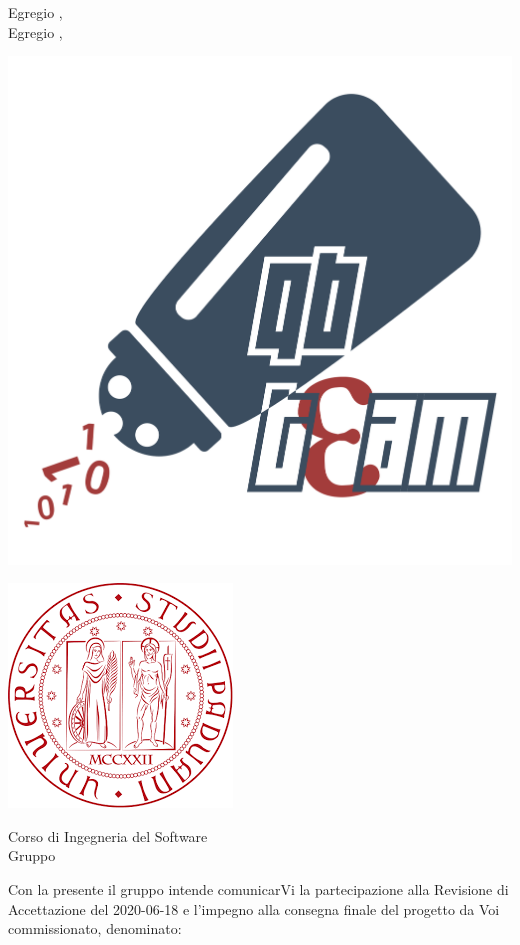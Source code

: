 \documentclass[12pt]{letter}
\begin{document}
    \begin{letter}
        { Egregio \VT{},\\Egregio \CR{},}
        \begin{minipage}{.4\textwidth}
            \begin{flushleft}
                \includegraphics[width=.4\linewidth]{../Utilita/Immagini/qbteam.png}
            \end{flushleft}
        \end{minipage}
        \begin{minipage}{.5\textwidth}
            \begin{flushright}
                \includegraphics[width=.4\linewidth]{../Utilita/Immagini/LogoUniPD.png}
            \end{flushright}
        \end{minipage}
        {    
        \begin{flushleft}
            Corso di Ingegneria del Software\\ Gruppo \Gruppo{}\\ 
        \end{flushleft}
        }
        \opening{ Con la presente il gruppo \Gruppo{} intende comunicarVi la partecipazione alla Revisione di Accettazione del 2020-06-18 e l'impegno alla consegna finale del progetto da Voi commissionato, denominato:}
        \begin{center}
           \textbf{\NomeProgetto{}} 
        \end{center}

\end{letter}
\end{document}
